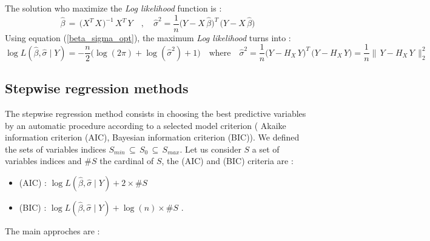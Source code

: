 The solution who maximize the {\it Log likelihood} function is :
\begin{equation}
\label{beta_sigma_opt}
  \hat{\beta} \,=\, \big(X^T_{} \,X_{}\big)^{-1} \,X^T \, Y
\quad,\quad 
\hat{\sigma}^2 = \frac{1}{n}\big(Y-X \,\hat{\beta}\big)^T\,\big(Y-X \,\hat{\beta}\big)
\end{equation}
Using equation (\ref{beta_sigma_opt}), the maximum {\it Log likelihood} turns into :
\begin{equation}
\label{maxLogLikelihood}
\log L(\hat{\beta},\hat{\sigma}\mid Y)=-\frac{n}{2}\big(\log(2\pi)+ \log(\hat{\sigma}^2)+1\big)
\quad \text{where} \quad
\hat{\sigma}^2 = \frac{1}{n}\big(Y-H_X\,Y\big)^T\,\big(Y-H_X\,Y \big)=\frac{1}{n}\|\,Y-H_X\,Y\,\|^2_2
\end{equation}

\subsection{Stepwise regression methods}

The stepwise regression method consists in choosing the best predictive variables by an automatic procedure
 according to a selected model criterion ( Akaike information criterion (AIC), Bayesian information criterion (BIC)).
We defined the sets of variables indices $ S_{min}\,\subseteq\, S_0\,\subseteq\, S_{max}$. 
Let us consider $S$ a set of variables indices and $\# S$ the cardinal of $S$, the (AIC) and (BIC) criteria are :  

\begin{itemize}
\item (AIC) : $\log L(\hat{\beta},\hat{\sigma}\mid Y) + 2 \times \# S $  
\item (BIC) : $\log L(\hat{\beta},\hat{\sigma}\mid Y) + \log(n) \times \# S $ .
\end{itemize}
The main approches are : 

\newpage
